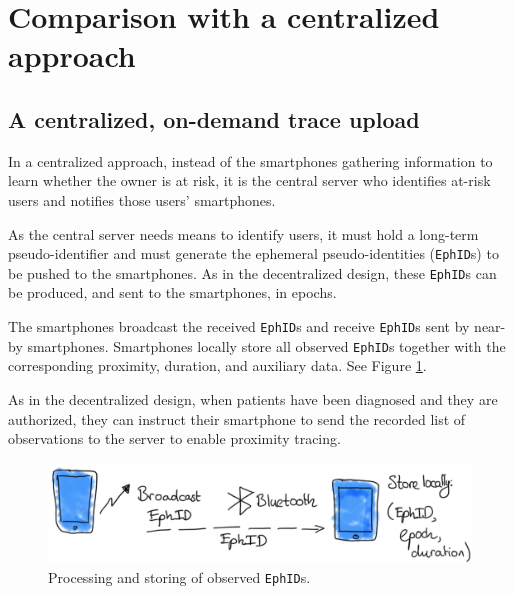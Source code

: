 \documentclass[12pt,a4paper]{article}
\begin{document}
\section*{Comparison with a centralized approach}
\subsection*{A centralized, on-demand trace upload}
In a centralized approach, instead of the smartphones gathering information to learn whether the owner is at risk, it is the central server who identifies at-risk users and notifies those users' smartphones.

As the central server needs means to identify users, it must hold a long-term
pseudo-identifier and must generate the ephemeral pseudo-identities (\texttt{EphID}s) to be pushed to the smartphones. As in the decentralized design, these \texttt{EphID}s can be produced, and sent to the smartphones, in epochs.

The smartphones broadcast the received \texttt{EphID}s and receive \texttt{EphID}s sent by near-by smartphones. Smartphones locally store all observed \texttt{EphID}s together with the corresponding proximity, duration, and auxiliary data. See Figure \ref{ZZ}.

As in the decentralized design, when patients have been diagnosed and they are authorized,
they can instruct their smartphone to send the recorded list of observations to the server to enable proximity tracing.
\begin{figure}[H]
\centering
\includegraphics[scale=0.4]{fig/ZZ}
\caption{Processing and storing of observed \texttt{EphID}s.}
\label{ZZ}
\end{figure}
\end{document}

